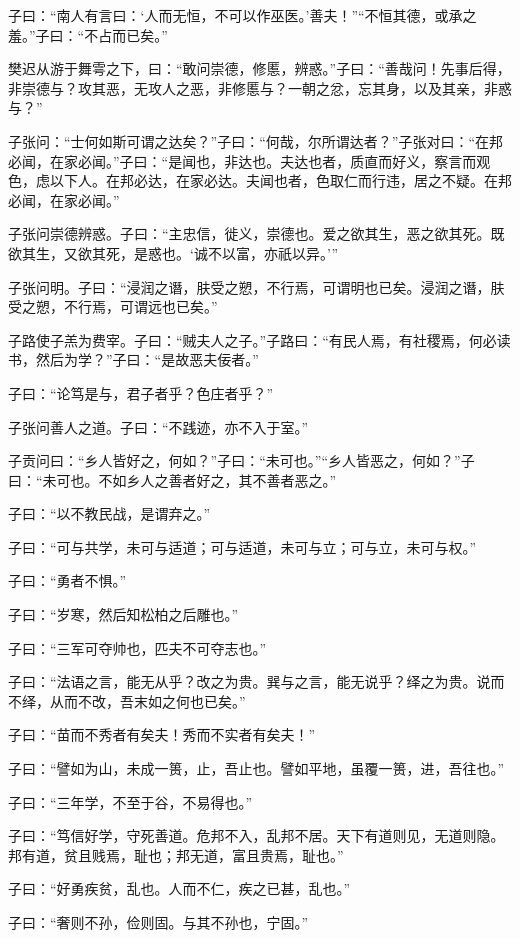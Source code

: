\documentclass[a5paper]{ctexbook}
\begin{document}
    子曰：“南人有言曰：‘人而无恒，不可以作巫医。’善夫！”“不恒其德，或承之羞。”子曰：“不占而已矣。”

    樊迟从游于舞雩之下，曰：“敢问崇德，修慝，辨惑。”子曰：“善哉问！先事后得，非崇德与？攻其恶，无攻人之恶，非修慝与？一朝之忿，忘其身，以及其亲，非惑与？”

    子张问：“士何如斯可谓之达矣？”子曰：“何哉，尔所谓达者？”子张对曰：“在邦必闻，在家必闻。”子曰：“是闻也，非达也。夫达也者，质直而好义，察言而观色，虑以下人。在邦必达，在家必达。夫闻也者，色取仁而行违，居之不疑。在邦必闻，在家必闻。”

    子张问崇德辨惑。子曰：“主忠信，徙义，崇德也。爱之欲其生，恶之欲其死。既欲其生，又欲其死，是惑也。‘诚不以富，亦祇以异。’”

    子张问明。子曰：“浸润之谮，肤受之愬，不行焉，可谓明也已矣。浸润之谮，肤受之愬，不行焉，可谓远也已矣。”

    子路使子羔为费宰。子曰：“贼夫人之子。”子路曰：“有民人焉，有社稷焉，何必读书，然后为学？”子曰：“是故恶夫佞者。”

    子曰：“论笃是与，君子者乎？色庄者乎？”

    子张问善人之道。子曰：“不践迹，亦不入于室。”

    子贡问曰：“乡人皆好之，何如？”子曰：“未可也。”“乡人皆恶之，何如？”子曰：“未可也。不如乡人之善者好之，其不善者恶之。”    

    子曰：“以不教民战，是谓弃之。”

    子曰：“可与共学，未可与适道；可与适道，未可与立；可与立，未可与权。”

    子曰：“勇者不惧。”

    子曰：“岁寒，然后知松柏之后雕也。”

    子曰：“三军可夺帅也，匹夫不可夺志也。”

    子曰：“法语之言，能无从乎？改之为贵。巽与之言，能无说乎？绎之为贵。说而不绎，从而不改，吾末如之何也已矣。”

    子曰：“苗而不秀者有矣夫！秀而不实者有矣夫！”

    子曰：“譬如为山，未成一篑，止，吾止也。譬如平地，虽覆一篑，进，吾往也。”

    子曰：“三年学，不至于谷，不易得也。”

    子曰：“笃信好学，守死善道。危邦不入，乱邦不居。天下有道则见，无道则隐。邦有道，贫且贱焉，耻也；邦无道，富且贵焉，耻也。”

    子曰：“好勇疾贫，乱也。人而不仁，疾之已甚，乱也。”

    子曰：“奢则不孙，俭则固。与其不孙也，宁固。”
\end{document}
